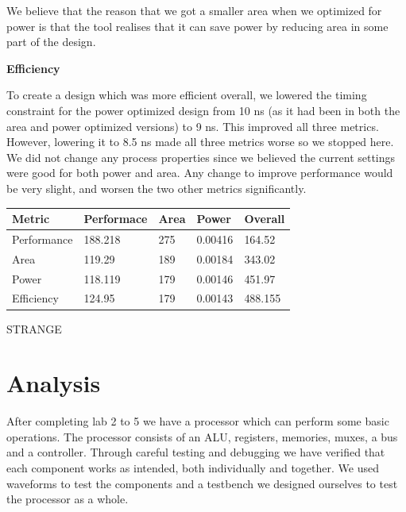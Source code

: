 \documentclass[a4paper,11pt]{article}
\begin{document}

We believe that the reason that we got a smaller area when we optimized for power is that the tool realises that it can save power by reducing area in some part of the design. 

\textbf{Efficiency}

To create a design which was more efficient overall, we lowered the timing constraint for the power optimized design from 10 ns (as it had been in both the area and power optimized versions) to 9 ns. This improved all three metrics. However, lowering it to 8.5 ns made all three metrics worse so we stopped here. We did not change any process properties since we believed the current settings were good for both power and area. Any change to improve performance would be very slight, and worsen the two other metrics significantly.

\begin{table}[h!]
  \begin{tabular}{|l||l|l|l|l|} \hline
  Metric & Performace & Area & Power & Overall \\ \hline
  Performance & 188.218 & 275 & 0.00416 & 164.52 \\
  Area & 119.29 & 189 &0.00184 & 343.02 \\
  Power & 118.119 & 179 & 0.00146 & 451.97 \\
  Efficiency & 124.95 & 179 & 0.00143 & 488.155\\ \hline
  \end{tabular}
\end{table}

STRANGE

\newpage
\section{Analysis}

After completing lab 2 to 5 we have a processor which can perform some basic operations. The processor consists of an ALU, registers, memories, muxes, a bus and a controller. Through careful testing and debugging we have verified that each component works as intended, both individually and together. We used waveforms to test the components and a testbench we designed ourselves to test the processor as a whole.
\end{document}
